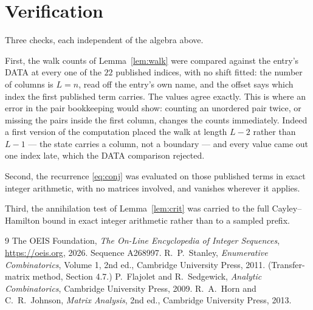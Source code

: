\documentclass[11pt,a4paper]{article}
\theoremstyle{plain}
\theoremstyle{definition}
\begin{document}
\section{Verification}

Three checks, each independent of the algebra above.

First, the walk counts of Lemma~\ref{lem:walk} were compared against the entry's DATA at
every one of the $22$ published indices, with no shift fitted: the number of columns is
$L=n$, read off the entry's own name, and the offset says which index the first
published term carries. The values agree exactly. This is where an error in the pair
bookkeeping would show: counting an unordered pair twice, or missing the pairs inside the
first column, changes the counts immediately. Indeed a first version of the computation
placed the walk at length $L-2$ rather than $L-1$ --- the state carries a column, not a
boundary --- and every value came out one index late, which the DATA comparison rejected.

Second, the recurrence \eqref{eq:conj} was evaluated on those published terms in exact
integer arithmetic, with no matrices involved, and vanishes wherever it applies.

Third, the annihilation test of Lemma~\ref{lem:crit} was carried to the full
Cayley--Hamilton bound in exact integer arithmetic rather than to a sampled prefix.

\begin{thebibliography}{9}
 The OEIS Foundation, \emph{The On-Line Encyclopedia of Integer
Sequences}, \url{https://oeis.org}, 2026. Sequence A268997.
 R.~P.~Stanley, \emph{Enumerative Combinatorics}, Volume 1, 2nd ed.,
Cambridge University Press, 2011. (Transfer-matrix method, Section 4.7.)
 P.~Flajolet and R.~Sedgewick, \emph{Analytic Combinatorics}, Cambridge
University Press, 2009.
 R.~A.~Horn and C.~R.~Johnson, \emph{Matrix Analysis}, 2nd ed., Cambridge
University Press, 2013.
\end{thebibliography}
\end{document}
